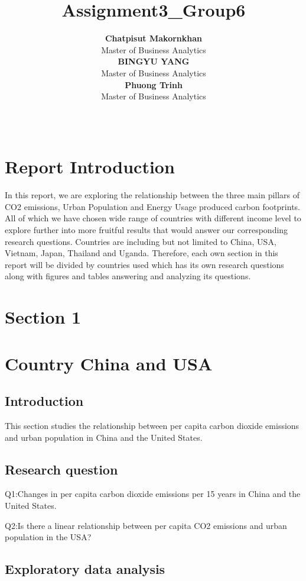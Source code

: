 \documentclass[11pt,a4paper,]{article}
\title{Assignment3\_Group6}
\author{\sf\Large\textbf{ Chatpisut Makornkhan}\\ {\sf\large Master of Business Analytics\\[0.5cm]} \sf\Large\textbf{ BINGYU YANG}\\ {\sf\large Master of Business Analytics\\[0.5cm]} \sf\Large\textbf{ Phuong Trinh}\\ {\sf\large Master of Business Analytics\\[0.5cm]}}
\date{\sf\Date~\Month~\Year}
\makeatletter
\def\titlepage{\front{\expandafter{\@title}}{\@author}{\@organization}}
\makeatother
\begin{document}
\titlepage

{
\setcounter{tocdepth}{2}
\tableofcontents
}
\hypertarget{report-introduction}{%
\section{Report Introduction}\label{report-introduction}}

In this report, we are exploring the relationship between the three main pillars of CO2 emissions, Urban Population and Energy Usage produced carbon footprints. All of which we have chosen wide range of countries with different income level to explore further into more fruitful results that would answer our corresponding research questions. Countries are including but not limited to China, USA, Vietnam, Japan, Thailand and Uganda. Therefore, each own section in this report will be divided by countries used which has its own research questions along with figures and tables answering and analyzing its questions.

\hypertarget{section-1}{%
\section{Section 1}\label{section-1}}

\section*{Country China and USA}

\hypertarget{introduction}{%
\subsection{Introduction}\label{introduction}}

This section studies the relationship between per capita carbon dioxide emissions and urban population in China and the United States.

\hypertarget{research-question}{%
\subsection{Research question}\label{research-question}}

Q1:Changes in per capita carbon dioxide emissions per 15 years in China and the United States.

Q2:Is there a linear relationship between per capita CO2 emissions and urban population in the USA?

\hypertarget{exploratory-data-analysis}{%
\subsection{Exploratory data analysis}\label{exploratory-data-analysis}}
\end{document}
